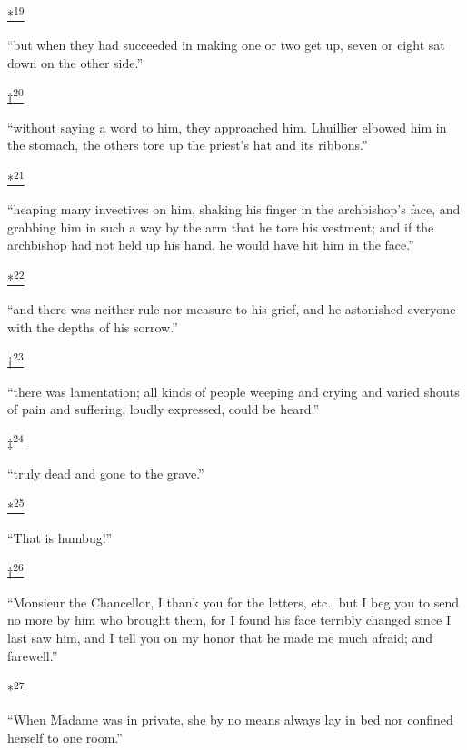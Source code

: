 \protect\hypertarget{23_NOTES.xhtmlux5cux23id_2446}{\protect\hyperlink{09_Chapter_Two__THE_CRAVING_FOR_A_M.xhtmlux5cux23id_2445}{*\textsuperscript{19}}}
``but when they had succeeded in making one or two get up, seven or
eight sat down on the other side.''

\protect\hypertarget{23_NOTES.xhtmlux5cux23id_2447}{\protect\hyperlink{09_Chapter_Two__THE_CRAVING_FOR_A_M.xhtmlux5cux23id_2448}{†\textsuperscript{20}}}
``without saying a word to him, they approached him. Lhuillier elbowed
him in the stomach, the others tore up the priest's hat and its
ribbons.''

\protect\hypertarget{23_NOTES.xhtmlux5cux23id_2450}{\protect\hyperlink{09_Chapter_Two__THE_CRAVING_FOR_A_M.xhtmlux5cux23id_2449}{*\textsuperscript{21}}}
``heaping many invectives on him, shaking his finger in the archbishop's
face, and grabbing him in such a way by the arm that he tore his
vestment; and if the archbishop had not held up his hand, he would have
hit him in the face.''

\protect\hypertarget{23_NOTES.xhtmlux5cux23id_2452}{\protect\hyperlink{09_Chapter_Two__THE_CRAVING_FOR_A_M.xhtmlux5cux23id_2451}{*\textsuperscript{22}}}
``and there was neither rule nor measure to his grief, and he astonished
everyone with the depths of his sorrow.''

\protect\hypertarget{23_NOTES.xhtmlux5cux23id_2454}{\protect\hyperlink{09_Chapter_Two__THE_CRAVING_FOR_A_M.xhtmlux5cux23id_2453}{†\textsuperscript{23}}}
``there was lamentation; all kinds of people weeping and crying and
varied shouts of pain and suffering, loudly expressed, could be heard.''

\protect\hypertarget{23_NOTES.xhtmlux5cux23id_2456}{\protect\hyperlink{09_Chapter_Two__THE_CRAVING_FOR_A_M.xhtmlux5cux23id_2455}{‡\textsuperscript{24}}}
``truly dead and gone to the grave.''

\protect\hypertarget{23_NOTES.xhtmlux5cux23id_2458}{\protect\hyperlink{09_Chapter_Two__THE_CRAVING_FOR_A_M.xhtmlux5cux23id_2457}{*\textsuperscript{25}}}
``That is humbug!''

\protect\hypertarget{23_NOTES.xhtmlux5cux23id_2460}{\protect\hyperlink{09_Chapter_Two__THE_CRAVING_FOR_A_M.xhtmlux5cux23id_2459}{†\textsuperscript{26}}}
``Monsieur the Chancellor, I thank you for the letters, etc., but I beg
you to send no more by him who brought them, for I found his face
terribly changed since I last saw him, and I tell you on my honor that
he made me much afraid; and farewell.''

\protect\hypertarget{23_NOTES.xhtmlux5cux23id_2462}{\protect\hyperlink{09_Chapter_Two__THE_CRAVING_FOR_A_M.xhtmlux5cux23id_2461}{*\textsuperscript{27}}}
``When Madame was in private, she by no means always lay in bed nor
confined herself to one room.''


